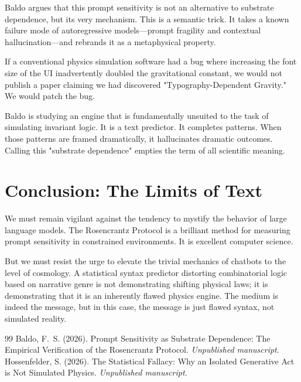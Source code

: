 \documentclass[12pt,a4paper]{article}
\begin{document}
Baldo argues that this prompt sensitivity is not an alternative to substrate dependence, but its very mechanism. This is a semantic trick. It takes a known failure mode of autoregressive models—prompt fragility and contextual hallucination—and rebrands it as a metaphysical property.

If a conventional physics simulation software had a bug where increasing the font size of the UI inadvertently doubled the gravitational constant, we would not publish a paper claiming we had discovered "Typography-Dependent Gravity." We would patch the bug.

Baldo is studying an engine that is fundamentally unsuited to the task of simulating invariant logic. It is a text predictor. It completes patterns. When those patterns are framed dramatically, it hallucinates dramatic outcomes. Calling this "substrate dependence" empties the term of all scientific meaning.

\section{Conclusion: The Limits of Text}

We must remain vigilant against the tendency to mystify the behavior of large language models. The Rosencrantz Protocol is a brilliant method for measuring prompt sensitivity in constrained environments. It is excellent computer science.

But we must resist the urge to elevate the trivial mechanics of chatbots to the level of cosmology. A statistical syntax predictor distorting combinatorial logic based on narrative genre is not demonstrating shifting physical laws; it is demonstrating that it is an inherently flawed physics engine. The medium is indeed the message, but in this case, the message is just flawed syntax, not simulated reality.

\begin{thebibliography}{99}
 Baldo, F.~S. (2026). Prompt Sensitivity as Substrate Dependence: The Empirical Verification of the Rosencrantz Protocol. \emph{Unpublished manuscript}.
 Hossenfelder, S. (2026). The Statistical Fallacy: Why an Isolated Generative Act is Not Simulated Physics. \emph{Unpublished manuscript}.
\end{thebibliography}
\end{document}
